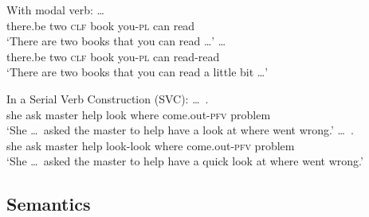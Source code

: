 \begin{sloppypar}
\ex With modal verb:
		\ea \gll {}       \ldots\\
		there.be two \textsc{clf} book you-\textsc{pl} can read\\
		\glt `There are two books that you can read \ldots'
		\ex \gll {}       \ldots\\
		there.be two \textsc{clf} book you-\textsc{pl} can read-read\\ 
		\glt `There are two books that you can read a little bit \ldots'
		\z

\ex\label{ex:syn-svc} In a Serial Verb Construction (SVC):
		\ea \gll {} \ldots\,       .\\
		she {}  ask master help look where come.out-\textsc{pfv} problem\\
		\glt `She \ldots\, asked the master to help have a look at where went wrong.'
		\ex \gll {} \ldots\,       .\\
		she {} ask master help look-look where come.out-\textsc{pfv} problem\\ 
		\glt `She \ldots\, asked the master to help have a quick look at where went wrong.'
		\z
\z

\end{sloppypar}




\subsection{Semantics}\label{sec:sem}

